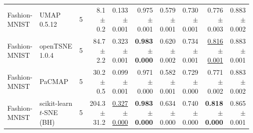\begin{tabular}{llrrrrrrrr}
Fashion-MNIST & UMAP 0.5.12 & 5 & 8.1 $\pm$ 0.2 & 0.133 $\pm$ 0.001 & 0.975 $\pm$ 0.001 & 0.579 $\pm$ 0.001 & 0.730 $\pm$ 0.001 & 0.776 $\pm$ 0.003 & 0.883 $\pm$ 0.002 \\
Fashion-MNIST & openTSNE 1.0.4 & 5 & 84.7 $\pm$ 2.2 & 0.323 $\pm$ 0.001 & \textbf{0.983 $\pm$ 0.000} & 0.620 $\pm$ 0.002 & 0.734 $\pm$ 0.001 & \underline{0.816 $\pm$ 0.001} & 0.883 $\pm$ 0.001 \\
Fashion-MNIST & PaCMAP & 5 & 30.2 $\pm$ 0.5 & 0.099 $\pm$ 0.001 & 0.971 $\pm$ 0.000 & 0.582 $\pm$ 0.001 & 0.729 $\pm$ 0.000 & 0.771 $\pm$ 0.002 & 0.883 $\pm$ 0.002 \\
Fashion-MNIST & scikit-learn $t$-SNE (BH) & 5 & 204.3 $\pm$ 31.2 & \underline{0.327 $\pm$ 0.000} & \textbf{0.983 $\pm$ 0.000} & 0.634 $\pm$ 0.000 & 0.740 $\pm$ 0.000 & \textbf{0.818 $\pm$ 0.000} & 0.865 $\pm$ 0.001 \\
\bottomrule
\end{tabular}
